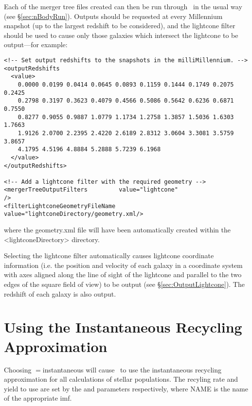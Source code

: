 Each of the merger tree files created can then be run through \glc\ in the usual way (see \S\ref{sec:nBodyRun}).  Outputs should be requested at every Millennium snapshot (up to the largest redshift to be considered), and the {\normalfont \ttfamily lightcone} filter should be used to cause only those galaxies which intersect the lightcone to be output---for example:
\begin{verbatim}
<!-- Set output redshifts to the snapshots in the milliMillennium. -->
<outputRedshifts
  <value>
    0.0000 0.0199 0.0414 0.0645 0.0893 0.1159 0.1444 0.1749 0.2075 0.2425
    0.2798 0.3197 0.3623 0.4079 0.4566 0.5086 0.5642 0.6236 0.6871 0.7550
    0.8277 0.9055 0.9887 1.0779 1.1734 1.2758 1.3857 1.5036 1.6303 1.7663
    1.9126 2.0700 2.2395 2.4220 2.6189 2.8312 3.0604 3.3081 3.5759 3.8657
    4.1795 4.5196 4.8884 5.2888 5.7239 6.1968
  </value>
</outputRedshifts>

<!-- Add a lightcone filter with the required geometry -->
<mergerTreeOutputFilters         value="lightcone"                     />
<filterLightconeGeometryFileName value="lightconeDirectory/geometry.xml/>
\end{verbatim}
where the {\normalfont \ttfamily geometry.xml} file will have been automatically created within the {\normalfont \ttfamily \textless lightconeDirectory\textgreater} directory.

Selecting the lightcone filter automatically causes lightcone coordinate information (i.e. the position and velocity of each galaxy in a coordinate system with axes aligned along the line of sight of the lightcone and parallel to the two edges of the square field of view) to be output (see \S\ref{sec:OutputLightcone}). The redshift of each galaxy is also output.

\section{Using the Instantaneous Recycling Approximation}

Choosing {\normalfont \ttfamily [stellarPopulationPropertiesMethod]}$=${\normalfont \ttfamily instantaneous} will cause \glc\ to use the instantaneous recycling approximation for all calculations of stellar populations. The recyling rate and yield to use are set by the {\normalfont \ttfamily [imfNAMERecycledInstantaneous]} and {\normalfont \ttfamily [imfNAMEYieldInstantaneous]} parameters respectively, where {\normalfont \ttfamily NAME} is the name of the appropriate \gls{imf}.


